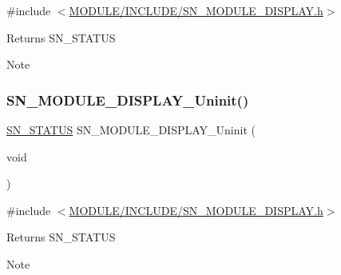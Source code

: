 {\ttfamily \#include $<$\hyperlink{SN__MODULE__DISPLAY_8h}{M\+O\+D\+U\+L\+E/\+I\+N\+C\+L\+U\+D\+E/\+S\+N\+\_\+\+M\+O\+D\+U\+L\+E\+\_\+\+D\+I\+S\+P\+L\+A\+Y.\+h}$>$}

\begin{DoxyReturn}{Returns}
S\+N\+\_\+\+S\+T\+A\+T\+US
\end{DoxyReturn}
\begin{DoxyNote}{Note}

\end{DoxyNote}
\mbox{\label{group__MODULE__DISPLAY_ga91f86811b5f4b83be3296c64ccd253ec}} 
\subsubsection{\texorpdfstring{S\+N\+\_\+\+M\+O\+D\+U\+L\+E\+\_\+\+D\+I\+S\+P\+L\+A\+Y\+\_\+\+Uninit()}{SN\_MODULE\_DISPLAY\_Uninit()}}
{\footnotesize\ttfamily \hyperlink{group__SYSTEM__ERROR_ga4540713b9a7a18ce44d78c3a10f7442f}{S\+N\+\_\+\+S\+T\+A\+T\+US} S\+N\+\_\+\+M\+O\+D\+U\+L\+E\+\_\+\+D\+I\+S\+P\+L\+A\+Y\+\_\+\+Uninit (\begin{DoxyParamCaption}\item[{void}]{ }\end{DoxyParamCaption})}



{\ttfamily \#include $<$\hyperlink{SN__MODULE__DISPLAY_8h}{M\+O\+D\+U\+L\+E/\+I\+N\+C\+L\+U\+D\+E/\+S\+N\+\_\+\+M\+O\+D\+U\+L\+E\+\_\+\+D\+I\+S\+P\+L\+A\+Y.\+h}$>$}

\begin{DoxyReturn}{Returns}
S\+N\+\_\+\+S\+T\+A\+T\+US 
\end{DoxyReturn}
\begin{DoxyNote}{Note}

\end{DoxyNote}
